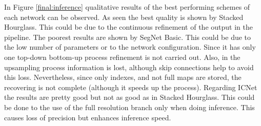 In Figure \ref{final:inference} qualitative results of the best performing schemes of each network can be observed. As seen the best quality is shown by Stacked Hourglass. This could be due to the continuous refinement of the output in the pipeline. The poorest results are shown by SegNet Basic. This could be due to the low number of parameters or to the network configuration. Since it has only one top-down bottom-up process refinement is not carried out. Also, in the upsampling process information is lost, although skip connections help to avoid this loss. Nevertheless, since only indexes, and not full maps are stored, the recovering is not complete (although it speeds up the process). Regarding ICNet the results are pretty good but not as good as in Stacked Hourglass. This could be done to the use of the full resolution branch only when doing inference. This causes loss of precision but enhances inference speed.\\



